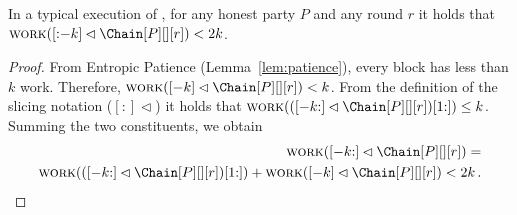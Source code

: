 \begin{corollary} \label{cor:slicing-work-bound}
  In a typical execution of \poem, for any honest party $P$ and any round $r$ it holds that
  $\work([{:}{-k}] \lhd \Chain[P][][r]) < 2k$.
\end{corollary}
\begin{proof}
  From Entropic Patience (Lemma~\ref{lem:patience}), every block has less than $k$ work. Therefore,
  $\work([-k] \lhd \Chain[P][][r]) < k$.
  From the definition of the slicing notation ($[{:}]\lhd$)
  it holds that $\work(([-k{:}] \lhd \Chain[P][][r])[1{:}]) \leq k$. Summing the two constituents,
  we obtain
  \begin{align*}
    \work([-k{:}] \lhd \Chain[P][][r]) =\\
    \work(([-k{:}] \lhd \Chain[P][][r])[1{:}]) + \work([-k] \lhd \Chain[P][][r]) < 2k\,.
  \end{align*}
  \Qed
\end{proof}

